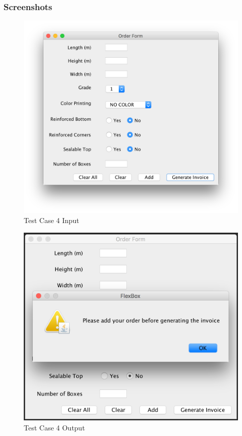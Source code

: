 \documentclass[12pt]{article}
\begin{document}
\subsubsection{Screenshots}
\begin{figure}[H]
	\includegraphics[width=\linewidth]{./screenshots/test_case_4_input.png}
	\caption{Test Case 4 Input}
	\label{test_case_4_input}
\end{figure}
\begin{figure}[H]
	\includegraphics[width=\linewidth]{./screenshots/test_case_4_output.png}
	\caption{Test Case 4 Output}
	\label{test_case_4_output}
\end{figure}
\newpage
\end{document}
